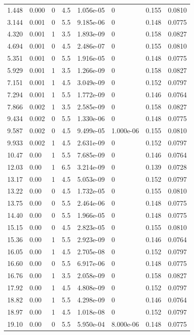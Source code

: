 \documentclass[preview]{standalone}
\begin{document}
{{\begin{tabular}{L{1.2cm}C{1.2cm} C{0.3cm}C{0.5cm} C{1.4cm}C{1.4cm} C{1.4cm}C{1.4cm}}
  1.448  &  0.000  & 0     & 4.5 &  1.056e-05  & 0  & 0.155 &  0.0810   \\ 
  3.144  &  0.001  & 0     & 5.5 &  9.185e-06  & 0  & 0.148 &  0.0775   \\ 
  4.320  &  0.001  & 1     & 3.5 &  1.893e-09  & 0  & 0.158 &  0.0827   \\ 
  4.694  &  0.001  & 0     & 4.5 &  2.486e-07  & 0  & 0.155 &  0.0810   \\ 
  5.351  &  0.001  & 0     & 5.5 &  1.916e-05  & 0  & 0.148 &  0.0775   \\ 
  5.929  &  0.001  & 1     & 3.5 &  1.266e-09  & 0  & 0.158 &  0.0827   \\ 
  7.151  &  0.001  & 1     & 4.5 &  3.049e-09  & 0  & 0.152 &  0.0797   \\ 
  7.294  &  0.001  & 1     & 5.5 &  1.772e-09  & 0  & 0.146 &  0.0764   \\ 
  7.866  &  0.002  & 1     & 3.5 &  2.585e-09  & 0  & 0.158 &  0.0827   \\ 
  9.434  &  0.002  & 0     & 5.5 &  1.330e-06  & 0  & 0.148 &  0.0775   \\ 
  9.587  &  0.002  & 0     & 4.5 &  9.499e-05  & 1.000e-06  & 0.155 &  0.0810   \\ 
  9.933  &  0.002  & 1     & 4.5 &  2.631e-09  & 0  & 0.152 &  0.0797   \\ 
  10.47  &  0.00  & 1     & 5.5 &  7.685e-09  & 0  & 0.146 &  0.0764   \\ 
  12.03  &  0.00  & 1     & 6.5 &  3.214e-09  & 0  & 0.139 &  0.0728   \\ 
  13.17  &  0.00  & 1     & 4.5 &  5.053e-09  & 0  & 0.152 &  0.0797   \\ 
  13.22  &  0.00  & 0     & 4.5 &  1.732e-05  & 0  & 0.155 &  0.0810   \\ 
  13.75  &  0.00  & 0     & 5.5 &  2.464e-06  & 0  & 0.148 &  0.0775   \\ 
  14.40  &  0.00  & 0     & 5.5 &  1.966e-05  & 0  & 0.148 &  0.0775   \\ 
  15.15  &  0.00  & 0     & 4.5 &  2.823e-05  & 0  & 0.155 &  0.0810   \\ 
  15.36  &  0.00  & 1     & 5.5 &  2.923e-09  & 0  & 0.146 &  0.0764   \\ 
  16.05  &  0.00  & 1     & 4.5 &  2.705e-08  & 0  & 0.152 &  0.0797   \\ 
  16.60  &  0.00  & 0     & 5.5 &  6.917e-06  & 0  & 0.148 &  0.0775   \\ 
  16.76  &  0.00  & 1     & 3.5 &  2.058e-09  & 0  & 0.158 &  0.0827   \\ 
  17.92  &  0.00  & 1     & 4.5 &  4.808e-09  & 0  & 0.152 &  0.0797   \\ 
  18.82  &  0.00  & 1     & 5.5 &  4.298e-09  & 0  & 0.146 &  0.0764   \\ 
  18.97  &  0.00  & 1     & 4.5 &  1.018e-08  & 0  & 0.152 &  0.0797   \\ 
  19.10  &  0.00  & 0     & 5.5 &  5.950e-04  & 8.000e-06  & 0.148 &  0.0775   \\ 
\hline 
\end{tabular} 

}}
\end{document}
